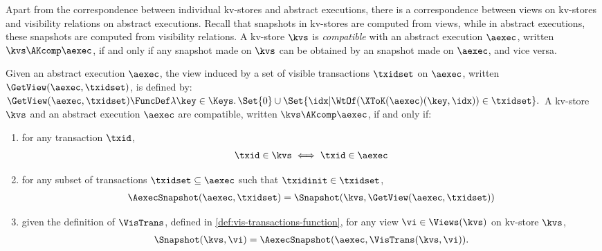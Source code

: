 Apart from the correspondence between individual kv-stores and abstract executions,
there is a correspondence between views on kv-stores and visibility relations on abstract executions.
Recall that snapshots in kv-stores are computed from views,
while in abstract executions, these snapshots are computed from visibility relations.
A kv-store \(\kvs\) is \emph{compatible} with an abstract execution \(\aexec\), 
written \( \kvs \AKcomp \aexec \), if and only if 
any snapshot made on \(\kvs\) can be obtained by an snapshot made on \(\aexec\), and vice versa. 

\begin{definition}
\label{def:compatible}
Given an abstract execution \( \aexec \), the view induced by a set of visible transactions \( \txidset \) 
on \( \aexec \), written \( \GetView(\aexec,\txidset) \), is defined by:
\(
    \GetView(\aexec,\txidset) \FuncDef \lambda 
    \key \in \Keys \ldotp \Set{0} \cup \Set{\idx | \WtOf({\XToK(\aexec)(\key,\idx)}) \in \txidset} .
\)
A kv-store \(\kvs\) and an abstract execution \(\aexec\) are compatible, written 
\(\kvs \AKcomp \aexec\), if and only if:
\begin{enumerate}
\item for any transaction \( \txid\),
\begin{align}
\txid \in \kvs \iff \txid \in \aexec \label{equ:ak-compatible-transactions}
\end{align}
\item for any subset of transactions \( \txidset \subseteq \aexec \) such that \( \txidinit \in \txidset \),
\begin{align}
\AexecSnapshot(\aexec,\txidset) = \Snapshot(\kvs,\GetView(\aexec,\txidset)) \label{equ:ak-compatible-vis-to-view}
\end{align}
\item given the definition of \( \VisTrans \), defined in \cref{def:vis-transactions-function},
    for any view \( \vi \in \Views(\kvs) \) on kv-store \( \kvs \),
\begin{align}
    \Snapshot(\kvs,\vi) = \AexecSnapshot(\aexec,\VisTrans(\kvs,\vi)) . \label{equ:ak-compatible-view-to-vis}
\end{align}
\end{enumerate}
\end{definition}


